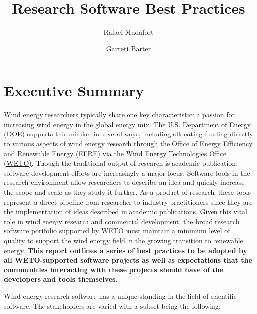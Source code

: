 \documentclass[]{nrel}
\title{Research Software Best Practices}
\author{Rafael Mudafort} %
\author{Garrett Barter} %
\affil{National Renewable Energy Laboratory}
\begin{document}
\frontmatter


\chapter{Executive Summary}

Wind energy researchers typically share one key characteristic: a passion for increasing
wind energy in the global energy mix. The U.S. Department of Energy (DOE) supports this mission
in several ways, including allocating funding directly to various aspects of wind energy
research through the
\href{https://www.energy.gov/eere/office-energy-efficiency-renewable-energy}{Office of Energy Efficiency and Renewable Energy (EERE)}
via the
\href{https://www.energy.gov/eere/wind/wind-energy-technologies-office}{Wind Energy Technologies Office (WETO)}.
Though the traditional output of research is academic publication, software development efforts
are increasingly a major focus. Software tools in the research environment allow researchers to
describe an idea and quickly increase the scope and scale as they study it further.
As a product of research, these tools represent a direct pipeline from researcher to industry
practitioners since they are the implementation of ideas described in academic publications.
Given this vital role in wind energy research and commercial development, the broad research software portfolio supported by WETO must maintain a minimum level of quality to support the wind energy field in the growing transition to renewable energy. \textbf{This report outlines a series of best practices to be adopted by all WETO-supported software projects as well as expectations that the communities interacting with these projects should have of the developers and tools themselves.}

Wind energy research software has a unique standing in the field of scientific software. The
stakeholders are varied with a subset being the following:
\end{document}
